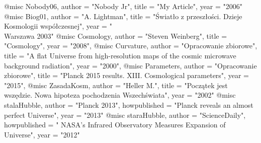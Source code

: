 @misc{ Nobody06,
       author = "Nobody Jr",
       title = "My Article",
       year = "2006" }
@misc{ Biog01,
    	author = "A. Lightman",
    	title = "Światło z przeszłości. Dzieje Kosmologii współczesnej",
    	year = "\\Warszawa 2003" }
@misc{ Cosmology, 
	   author = "Steven Weinberg",
	   title = "Cosmology",
	   year = "2008",}
@misc{ Curvature, 
		author = "Opracowanie zbiorowe",
		title = "A flat Universe from high-resolution maps of the cosmic microwave background radiation",
		year = "2000",}
@misc{ Parameters,
	   author = "Opracowanie zbiorowe", 
	   title = "Planck 2015 results. XIII. Cosmological parameters",
	   year = "2015",}
@misc{ ZasadaKosm,
	   author = "Heller M.",
	   title = "Początek jest wszędzie. Nowa hipoteza pochodzenia Wszechświata",
	   year = "2002"}
@misc{ stalaHubble,
		author = "Planck 2013",
		howpublished = "Planck reveals an almost perfect Universe",
		year = "2013"}
@misc{ staraHubble,
	author = "ScienceDaily",
	howpublished = " NASA’s Infrared Observatory Measures Expansion of Universe",
	year = "2012"
	}
